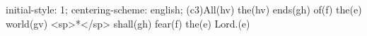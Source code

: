 initial-style: 1;
centering-scheme: english;
(c3)All(hv) the(hv) ends(gh) of(f) the(e) world(gv) <sp>*</sp> shall(gh) fear(f) the(e) Lord.(e)
